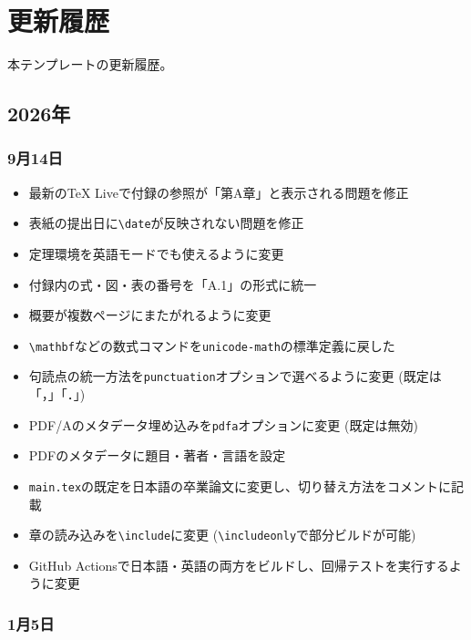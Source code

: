 \chapter{更新履歴}
\label{chap:change-log}

\begin{chapabst}
  本テンプレートの更新履歴。
\end{chapabst}

\section*{2026年}

\subsection*{9月14日}

\begin{itemize}
  \item 最新のTeX Liveで付録の参照が「第A章」と表示される問題を修正
  \item 表紙の提出日に\texttt{\textbackslash date}が反映されない問題を修正
  \item 定理環境を英語モードでも使えるように変更
  \item 付録内の式・図・表の番号を「A.1」の形式に統一
  \item 概要が複数ページにまたがれるように変更
  \item \texttt{\textbackslash mathbf}などの数式コマンドを\texttt{unicode-math}の標準定義に戻した
  \item 句読点の統一方法を\texttt{punctuation}オプションで選べるように変更 (既定は「，」「．」)
  \item PDF/Aのメタデータ埋め込みを\texttt{pdfa}オプションに変更 (既定は無効)
  \item PDFのメタデータに題目・著者・言語を設定
  \item \texttt{main.tex}の既定を日本語の卒業論文に変更し、切り替え方法をコメントに記載
  \item 章の読み込みを\texttt{\textbackslash include}に変更 (\texttt{\textbackslash includeonly}で部分ビルドが可能)
  \item GitHub Actionsで日本語・英語の両方をビルドし、回帰テストを実行するように変更
\end{itemize}

\subsection*{1月5日}

